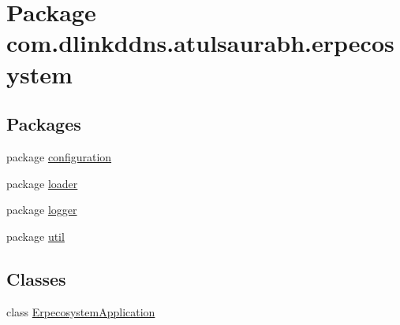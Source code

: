 \hypertarget{namespacecom_1_1dlinkddns_1_1atulsaurabh_1_1erpecosystem}{}\section{Package com.\+dlinkddns.\+atulsaurabh.\+erpecosystem}
\label{namespacecom_1_1dlinkddns_1_1atulsaurabh_1_1erpecosystem}
\subsection*{Packages}
\begin{DoxyCompactItemize}
\item 
package \mbox{\hyperlink{namespacecom_1_1dlinkddns_1_1atulsaurabh_1_1erpecosystem_1_1configuration}{configuration}}
\item 
package \mbox{\hyperlink{namespacecom_1_1dlinkddns_1_1atulsaurabh_1_1erpecosystem_1_1loader}{loader}}
\item 
package \mbox{\hyperlink{namespacecom_1_1dlinkddns_1_1atulsaurabh_1_1erpecosystem_1_1logger}{logger}}
\item 
package \mbox{\hyperlink{namespacecom_1_1dlinkddns_1_1atulsaurabh_1_1erpecosystem_1_1util}{util}}
\end{DoxyCompactItemize}
\subsection*{Classes}
\begin{DoxyCompactItemize}
\item 
class \mbox{\hyperlink{classcom_1_1dlinkddns_1_1atulsaurabh_1_1erpecosystem_1_1_erpecosystem_application}{Erpecosystem\+Application}}
\end{DoxyCompactItemize}
